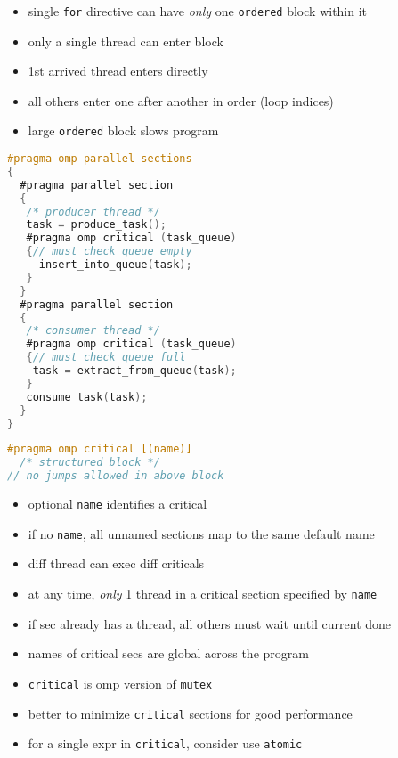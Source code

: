 \documentclass[8pt,a4paper,landscape]{extarticle}
\begin{document}
\begin{multicols*}{3}
\begin{minipage}{0.5\linewidth}
\begin{itemize}
  \item single \texttt{for} directive can have \emph{only} one \texttt{ordered} block within it
  \item only a single thread can enter block
  \item 1st arrived thread enters directly
  \item all others enter one after another in order (loop indices)
  \item large \texttt{ordered} block slows program
\end{itemize}
\end{minipage}
\begin{minipage}{0.5\linewidth}
\begin{lstlisting}[language=C]
#pragma omp parallel sections
{
  #pragma parallel section
  {
   /* producer thread */
   task = produce_task();
   #pragma omp critical (task_queue)
   {// must check queue_empty
     insert_into_queue(task);
   }
  }
  #pragma parallel section
  {
   /* consumer thread */
   #pragma omp critical (task_queue)
   {// must check queue_full
    task = extract_from_queue(task);
   }
   consume_task(task);
  }
}
\end{lstlisting}
\end{minipage}
\begin{minipage}{0.5\linewidth}
\begin{lstlisting}[language=C,xleftmargin=4pt,framextopmargin=2pt]
#pragma omp critical [(name)]
  /* structured block */
// no jumps allowed in above block
\end{lstlisting}
  \begin{itemize}
  \item optional \texttt{name} identifies a critical
  \item if no \texttt{name}, all unnamed sections map to the same default name
  \item diff thread can exec diff criticals
  \item at any time, \emph{only} 1 thread in a critical section specified by \texttt{name}
  \item if sec already has a thread, all others must wait until current done
  \item names of critical secs are global across the program
  \item \texttt{critical} is omp version of \texttt{mutex}
  \item better to minimize \texttt{critical} sections for good performance
  \item for a single expr in \texttt{critical}, consider use \texttt{atomic}

\end{itemize}
\end{minipage}
\end{multicols*}
\end{document}
